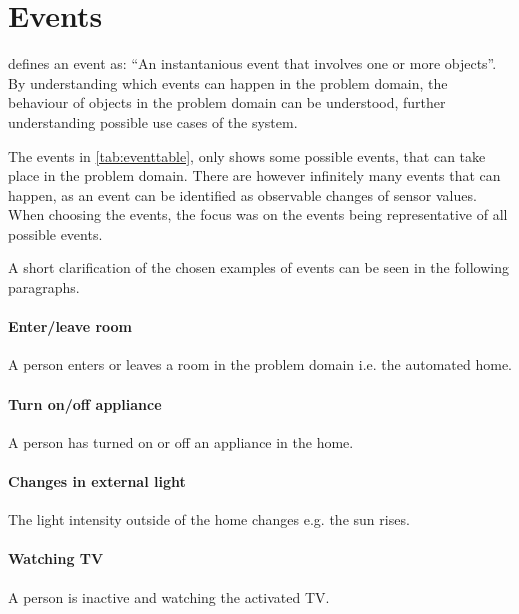\section{Events}\label{sec:events}

\citet{OOAD} defines an event as: \enquote{An instantanious event that involves one or more objects}. By understanding which events can happen in the problem domain, the behaviour of objects in the problem domain can be understood, further understanding possible use cases of the system.

The events in \cref{tab:eventtable}, only shows some possible events, that can take place in the problem domain. There are however infinitely many events that can happen, as an event can be identified as observable changes of sensor values. When choosing the events, the focus was on the events being representative of all possible events.

A short clarification of the chosen examples of events can be seen in the following paragraphs.

\paragraph{Enter/leave room} A person enters or leaves a room in the problem domain i.e. the automated home.
\paragraph{Turn on/off appliance} A person has turned on or off an appliance in the home.
\paragraph{Changes in external light} The light intensity outside of the home changes e.g. the sun rises.
\paragraph{Watching TV} A person is inactive and watching the activated TV.

